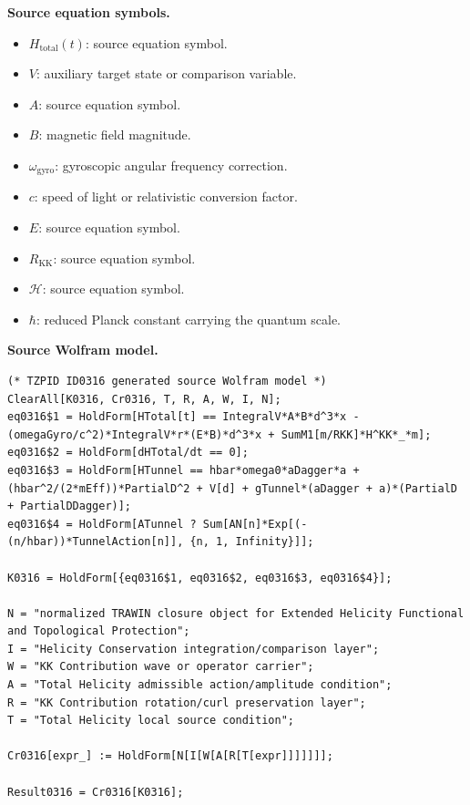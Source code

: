 \begin{minipage}[t]{0.49\linewidth}
\begingroup
\small
\raggedright
\textbf{Source equation symbols.}\par
\begin{itemize}[leftmargin=1.35em,itemsep=1pt,topsep=1pt,parsep=0pt]
    \item $H_{\mathrm{total}}(t)$: source equation symbol.
    \item $V$: auxiliary target state or comparison variable.
    \item $A$: source equation symbol.
    \item $B$: magnetic field magnitude.
    \item $\omega_{\mathrm{gyro}}$: gyroscopic angular frequency correction.
    \item $c$: speed of light or relativistic conversion factor.
    \item $E$: source equation symbol.
    \item $R_{\mathrm{KK}}$: source equation symbol.
    \item $\mathcal{H}$: source equation symbol.
    \item $\hbar$: reduced Planck constant carrying the quantum scale.
\end{itemize}
\endgroup
\end{minipage}\hfill
\begin{minipage}[t]{0.47\linewidth}
\begingroup
\scriptsize
\raggedright
\textbf{Source Wolfram model.}\par
\begin{Verbatim}[fontsize=\tiny,breaklines=true,breakanywhere=true]
(* TZPID ID0316 generated source Wolfram model *)
ClearAll[K0316, Cr0316, T, R, A, W, I, N];
eq0316$1 = HoldForm[HTotal[t] == IntegralV*A*B*d^3*x - (omegaGyro/c^2)*IntegralV*r*(E*B)*d^3*x + SumM1[m/RKK]*H^KK*_*m];
eq0316$2 = HoldForm[dHTotal/dt == 0];
eq0316$3 = HoldForm[HTunnel == hbar*omega0*aDagger*a + (hbar^2/(2*mEff))*PartialD^2 + V[d] + gTunnel*(aDagger + a)*(PartialD + PartialDDagger)];
eq0316$4 = HoldForm[ATunnel ? Sum[AN[n]*Exp[(-(n/hbar))*TunnelAction[n]], {n, 1, Infinity}]];

K0316 = HoldForm[{eq0316$1, eq0316$2, eq0316$3, eq0316$4}];

N = "normalized TRAWIN closure object for Extended Helicity Functional and Topological Protection";
I = "Helicity Conservation integration/comparison layer";
W = "KK Contribution wave or operator carrier";
A = "Total Helicity admissible action/amplitude condition";
R = "KK Contribution rotation/curl preservation layer";
T = "Total Helicity local source condition";

Cr0316[expr_] := HoldForm[N[I[W[A[R[T[expr]]]]]]];

Result0316 = Cr0316[K0316];
\end{Verbatim}
\endgroup
\end{minipage}

